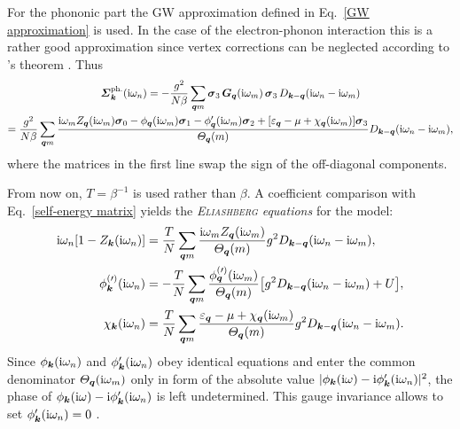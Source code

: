 For the phononic part the GW approximation defined in Eq.~\ref{GW approximation}
is used. In the case of the electron-phonon interaction this is a rather good
approximation since vertex corrections can be neglected according to
's theorem \cite{Migdal58}. Thus
%
\begin{multline*}
    \boldsymbol {\varSigma}_{\boldsymbol k} \sp{\text{ph.}} (\mathrm i \omega_n)
    = -\frac{g^2}{N \beta} \sum_{\boldsymbol q m}
    \boldsymbol \sigma_3 \, \boldsymbol G_{\boldsymbol q}(\mathrm i \omega_m) \, \boldsymbol \sigma_3 \,
    D_{\boldsymbol k - \boldsymbol q}(\mathrm i \omega_n - \mathrm i \omega_m)
    \\
    = \frac{g^2}{N \beta} \sum_{\boldsymbol q m}
    \frac { \mathrm i \omega_m
              Z_{\boldsymbol q}(\mathrm i \omega_m) \boldsymbol \sigma_0
        - \phi _{\boldsymbol q}(\mathrm i \omega_m) \boldsymbol \sigma_1
        - \phi'_{\boldsymbol q}(\mathrm i \omega_m) \boldsymbol \sigma_2
        + [\varepsilon_{\boldsymbol q} - \mu + \chi_{\boldsymbol q}(\mathrm i \omega_m)] \boldsymbol \sigma_3 }
        {\varTheta_{\boldsymbol q}(m)}
    D_{\boldsymbol k - \boldsymbol q}(\mathrm i \omega_n - \mathrm i \omega_m),
\end{multline*}
%
where the  matrices in the first line swap the sign of the
off-diagonal components.

From now on, $T = \beta^{-1}$ is used rather than $\beta$. A coefficient
comparison with Eq.~\ref{self-energy matrix} yields the
\emph{\textsc{Eliashberg} equations} \cite{Eliashberg60} for the
 model:
%
\begin{subequations}
    \begin{align}
        \mathrm i \omega_n [1 - Z_{\boldsymbol k}(\mathrm i \omega_n)] &= \frac T N
        \sum_{\boldsymbol q m} \frac
            {\mathrm i \omega_m Z_{\boldsymbol q}(\mathrm i \omega_m)}
            {\varTheta_{\boldsymbol q}(m)}
        g^2 D_{\boldsymbol k - \boldsymbol q}(\mathrm i \omega_n - \mathrm i \omega_m),
        \\
        \phi^{(\prime)}_{\boldsymbol k}(\mathrm i \omega_n) &= -\frac T N
        \sum_{\boldsymbol q m} \frac
            {\phi^{(\prime)}_{\boldsymbol q}(\mathrm i \omega_m)}
            {\varTheta_{\boldsymbol q}(m)}
        \big[ g^2 D_{\boldsymbol k - \boldsymbol q}(\mathrm i \omega_n - \mathrm i \omega_m) + U \big],
        \\
        \chi_{\boldsymbol k}(\mathrm i \omega_n) &= \frac T N
        \sum_{\boldsymbol q m} \frac
            {\varepsilon_{\boldsymbol q} - \mu + \chi_{\boldsymbol q}(\mathrm i \omega_m)}
            {\varTheta_{\boldsymbol q}(m)}
        g^2 D_{\boldsymbol k - \boldsymbol q}(\mathrm i \omega_n - \mathrm i \omega_m).
    \end{align}
\end{subequations}
%
Since $\phi_{\boldsymbol k}(\mathrm i \omega_n)$ and $\phi'_{\boldsymbol k}(\mathrm i \omega_n)$ obey
identical equations and enter the common denominator $\varTheta_{\boldsymbol q}(\mathrm i
\omega_m)$ only in form of the absolute value $|\phi_{\boldsymbol k}(\mathrm i \omega) - \mathrm i
\phi'_{\boldsymbol k}(\mathrm i \omega_n)|^2$, the phase of $\phi_{\boldsymbol k}(\mathrm i \omega) - \mathrm i
\phi'_{\boldsymbol k}(\mathrm i \omega_n)$ is left undetermined. This gauge invariance allows
to set $\phi'_{\boldsymbol k}(\mathrm i \omega_n) = 0$ \cites[37]{AllenMitrovic82}[around
Eq.~2.20]{Nambu60}.

